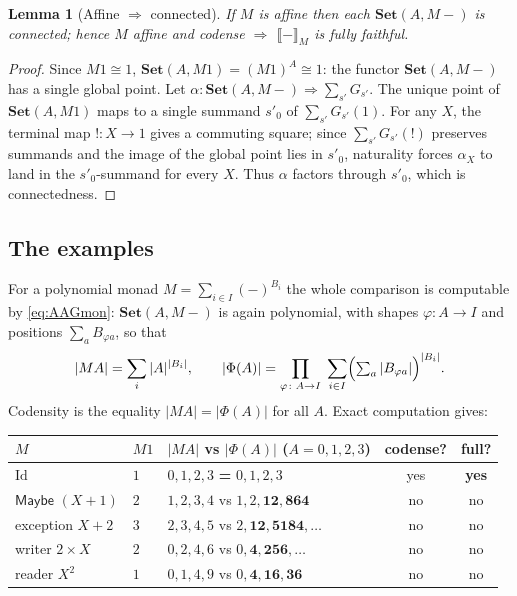 \documentclass[11pt]{amsart}
\theoremstyle{plain}
\newtheorem{lemma}[theorem]{Lemma}
\theoremstyle{definition}
\newcommand{\Set}{\mathbf{Set}}
\newcommand{\extM}[1]{\llbracket #1 \rrbracket_{M}}
\newcommand{\Id}{\mathrm{Id}}
\newcommand{\Maybe}{\mathsf{Maybe}}
\begin{document}
\begin{lemma}[Affine $\Rightarrow$ connected]\label{lem:affine}
If $M$ is affine then each $\Set(A,M{-})$ is connected; hence $M$ affine and codense $\Rightarrow$
$\extM{-}$ is fully faithful.
\end{lemma}

\begin{proof}
Since $M1\cong1$, $\Set(A,M1)=(M1)^A\cong1$: the functor $\Set(A,M{-})$ has a single global point.
Let $\alpha\colon\Set(A,M{-})\Rightarrow\sum_{s'}G_{s'}$. The unique point of $\Set(A,M1)$ maps to a
single summand $s'_0$ of $\sum_{s'}G_{s'}(1)$. For any $X$, the terminal map $!\colon X\to1$ gives a
commuting square; since $\sum_{s'}G_{s'}(!)$ preserves summands and the image of the global point
lies in $s'_0$, naturality forces $\alpha_X$ to land in the $s'_0$-summand for every $X$. Thus
$\alpha$ factors through $s'_0$, which is connectedness.
\end{proof}

\subsection{The examples}
For a polynomial monad $M=\sum_{i\in I}(-)^{B_i}$ the whole comparison is computable by
\eqref{eq:AAGmon}: $\Set(A,M{-})$ is again polynomial, with shapes $\varphi\colon A\to I$ and
positions $\sum_{a}B_{\varphi a}$, so that
\[
  |MA|=\sum_{i}|A|^{|B_i|},\qquad
  |\Phi(A)|=\prod_{\varphi\colon A\to I}\;\sum_{i\in I}\Bigl(\textstyle\sum_a
  |B_{\varphi a}|\Bigr)^{|B_i|}.
\]
Codensity is the equality $|MA|=|\Phi(A)|$ for all $A$. Exact computation gives:

\begin{center}
\renewcommand{\arraystretch}{1.2}
\begin{tabular}{lllcc}
\hline
$M$ & $M1$ & $|MA|$ vs $|\Phi(A)|$ ($A=0,1,2,3$) & codense? & full?\\
\hline
$\Id$ & $1$ & $0,1,2,3$ \; \textbf{=} \; $0,1,2,3$ & yes & \textbf{yes}\\
$\Maybe$ $(X{+}1)$ & $2$ & $1,2,3,4$ vs $1,2,\mathbf{12},\mathbf{864}$ & no & no\\
exception $X{+}2$ & $3$ & $2,3,4,5$ vs $2,\mathbf{12},\mathbf{5184},\dots$ & no & no\\
writer $2{\times}X$ & $2$ & $0,2,4,6$ vs $0,\mathbf{4},\mathbf{256},\dots$ & no & no\\
reader $X^{2}$ & $1$ & $0,1,4,9$ vs $0,\mathbf{4},\mathbf{16},\mathbf{36}$ & no & no\\
\hline
\end{tabular}
\end{center}
\end{document}
